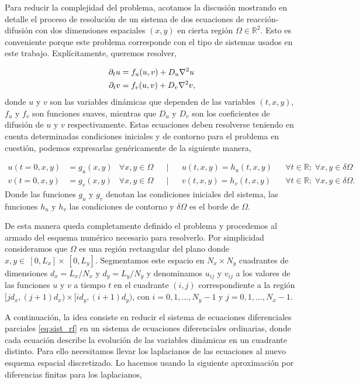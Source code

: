 Para reducir la complejidad del problema, acotamos la discusión mostrando en detalle el proceso de resolución de un sistema de 
dos ecuaciones de reacción-difusión con dos dimensiones espaciales $(x,y)$ en cierta región $\Omega \in \mathbb{R}^2$. Esto es conveniente porque 
este problema corresponde con el tipo de sistemas usados en este trabajo. Explícitamente, queremos resolver,

\begin{equation}
\begin{split}
 \partial_t u & = f_u(u,v) + D_u \laplacian{u}\\
 \partial_t v & = f_v(u,v) + D_v \laplacian{v}, 
\label{eq:sist_rf}
\end{split}
\end{equation}
donde $u$ y $v$ son las variables dinámicas que dependen de las variables $(t,x,y)$, $f_u$ y $f_v$ son funciones suaves, mientras que $D_u$ y $D_v$ 
son los coeficientes de difusión de $u$ y $v$ respectivamente. Estas ecuaciones deben resolverse teniendo en cuenta determinadas condiciones iniciales y 
de contorno para el problema en cuestión, podemos expresarlas genéricamente de la siguiente manera,

\begin{align*}
u(t = 0,x,y) & = g_u(x,y) & \forall x,y \in \Omega &&|&& u(t,x,y) = h_u(t,x,y) && \forall t\in \mathbb{R};\; \forall x,y \in \delta \Omega\\
v(t = 0,x,y) & = g_v(x,y) & \forall x,y \in \Omega &&|&& v(t,x,y) = h_v(t,x,y) && \forall t\in \mathbb{R};\; \forall x,y \in \delta \Omega.
\label{eq:ic}
\end{align*}
Donde las funciones $g_u$ y $g_v$ denotan las condiciones iniciales del sistema, las funciones $h_u$ y $h_v$ las 
condiciones de contorno y $\delta \Omega$ es el borde de $\Omega$.

De esta manera queda completamente definido el problema y procedemos al armado del esquema numérico necesario para resolverlo. Por simplicidad consideramos que 
$\Omega$ es una región rectangular del plano donde $x,y \in ~ [0,L_x] \times ~[0,L_y]$. Segmentamos este espacio en $N_x \times N_y$ cuadrantes de dimensiones $d_x = L_x/N_x$ y 
$d_y=L_y/N_y$ y denominamos $u_{ij}$ y $v_{ij}$ a los valores de las funciones $u$ y $v$ a tiempo $t$ en el cuadrante $(i,j)$ correspondiente a la región 
$[jd_x,(j+1)d_x) \times [id_y,(i+1)d_y)$, con $i =0,1,...,N_y-1$ y $j = 0,1,...,N_x-1$.

A continuación, la idea consiste en reducir el sistema de ecuaciones diferenciales parciales \ref{eq:sist_rf} en un sistema de ecuaciones diferenciales ordinarias, donde 
cada ecuación describe la evolución de las variables dinámicas en un cuadrante distinto. Para ello necesitamos llevar los laplacianos de las ecuaciones al nuevo esquema 
espacial discretizado. Lo hacemos usando la siguiente aproximación por diferencias finitas para los laplacianos,

